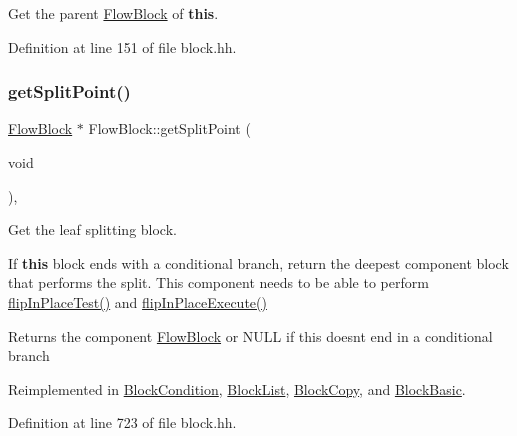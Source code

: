 Get the parent \mbox{\hyperlink{class_flow_block}{Flow\+Block}} of {\bfseries{this}}. 



Definition at line 151 of file block.\+hh.

\mbox{\label{class_flow_block_a20996aacbad259e2e4a7bb0c72482335}} 
\subsubsection{\texorpdfstring{getSplitPoint()}{getSplitPoint()}}
{\footnotesize\ttfamily \mbox{\hyperlink{class_flow_block}{Flow\+Block}} $\ast$ Flow\+Block\+::get\+Split\+Point (\begin{DoxyParamCaption}\item[{void}]{ }\end{DoxyParamCaption})\hspace{0.3cm}{\ttfamily [inline]}, {\ttfamily [virtual]}}



Get the leaf splitting block. 

If {\bfseries{this}} block ends with a conditional branch, return the deepest component block that performs the split. This component needs to be able to perform \mbox{\hyperlink{class_flow_block_a09019e2e4104844e1a698ccf72560bef}{flip\+In\+Place\+Test()}} and \mbox{\hyperlink{class_flow_block_a263ec50d30f807a8e1286ac37c6728ce}{flip\+In\+Place\+Execute()}} \begin{DoxyReturn}{Returns}
the component \mbox{\hyperlink{class_flow_block}{Flow\+Block}} or N\+U\+LL if this doesn\textquotesingle{}t end in a conditional branch 
\end{DoxyReturn}


Reimplemented in \mbox{\hyperlink{class_block_condition_a031007ca09262646abc489c6d5d29e50}{Block\+Condition}}, \mbox{\hyperlink{class_block_list_a18e5d3b6de59ea0522dfb1eb96c012c6}{Block\+List}}, \mbox{\hyperlink{class_block_copy_a86c90bb0020298ac2287ff5ab46af8a2}{Block\+Copy}}, and \mbox{\hyperlink{class_block_basic_a22d7b010455f00b1bb1ff5efb3d00550}{Block\+Basic}}.



Definition at line 723 of file block.\+hh.

